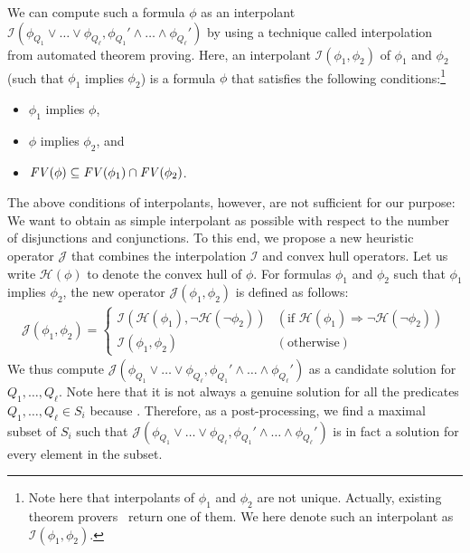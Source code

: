 We can compute such a formula \(\phi\) as an interpolant 
\(\mathcal{I}(\phi_{Q_1} \lor \dots \lor \phi_{Q_{\ell}},\phi_{Q_1}' 
\land \dots \land \phi_{Q_{\ell}}')\) by using a technique called 
interpolation~\cite{Henzinger2004,McMillan2005} from automated theorem 
proving.  Here, an interpolant \(\mathcal{I}(\phi_1,\phi_2)\) of 
\(\phi_1\) and \(\phi_2\) (such that \(\phi_1\) implies \(\phi_2\)) is a 
formula \(\phi\) that satisfies the following conditions:\footnote{Note 
here that interpolants of \(\phi_1\) and \(\phi_2\) are not unique.  
Actually, existing theorem 
provers~\cite{Henzinger2004,McMillan2005,Beyer2008} return one of them.  
We here denote such an interpolant as \(\mathcal{I}(\phi_1,\phi_2)\).}
\begin{itemize}
\item \(\phi_1\) implies \(\phi\),
\item \(\phi\) implies \(\phi_2\), and
\item \(\mathit{FV}({\phi}) \subseteq \mathit{FV}({\phi_1}) \cap \mathit{FV}({\phi_2})\).
\end{itemize}
The above conditions of interpolants, however, are not sufficient for 
our purpose: We want to obtain as simple interpolant as possible with 
respect to the number of disjunctions and conjunctions.  To this end, we 
propose a new heuristic operator \(\mathcal{J}\) that combines the 
interpolation \(\mathcal{I}\) and convex hull operators.  Let us write 
\(\mathcal{H}(\phi)\) to denote the convex hull of \(\phi\).  For 
formulas \(\phi_1\) and \(\phi_2\) such that \(\phi_1\) implies 
\(\phi_2\), the new operator \(\mathcal{J}(\phi_1,\phi_2)\) is defined 
as follows:
\begin{eqnarray*}
\mathcal{J}(\phi_1,\phi_2) =
\left\{
\begin{array}{ll}
\mathcal{I}(\mathcal{H}(\phi_1),\neg \mathcal{H}(\neg \phi_2)) & (\mbox{if~}\mathcal{H}(\phi_1) \Rightarrow \neg \mathcal{H}(\neg \phi_2)) \\
\mathcal{I}(\phi_1,\phi_2) & (\mbox{otherwise})
\end{array}
\right.
\end{eqnarray*}
  We thus compute 
\(\mathcal{J}(\phi_{Q_1} \lor \dots \lor \phi_{Q_{\ell}},\phi_{Q_1}' 
\land \dots \land \phi_{Q_{\ell}}')\) as a candidate solution for 
\(Q_1,\dots,Q_{\ell}\).  Note here that it is not always a genuine 
solution for all the predicates \(Q_1,\dots,Q_{\ell} \in S_i\) because 
\todo{}.  Therefore, as a post-processing, we find a maximal subset of 
\(S_i\) such that \(\mathcal{J}(\phi_{Q_1} \lor \dots \lor 
\phi_{Q_{\ell}},\phi_{Q_1}' \land \dots \land \phi_{Q_{\ell}}')\) is in 
fact a solution for every element in the subset.



%
